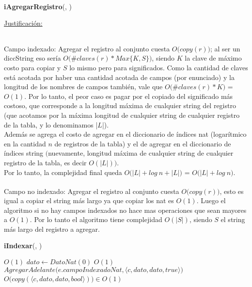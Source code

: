 \begin{Algoritmos}
\begin{algorithm}[H]{\textbf{iAgregarRegistro}(, )}
\begin{algorithmic}
  \end{algorithmic}
\end{algorithm}

\clearpage

\begin{algorithm}
  \begin{algorithmic}

    \Statex \underline{Justificación:} {\\
\quad\quad Campo indexado: Agregar el registro al conjunto cuesta $O\big(copy (r)\big)$; al ser un diccString eso sería $O\big(\#claves(r) * Max\{K,S\}\big)$, siendo $K$ la clave de máximo costo para copiar y $S$ lo mismo pero para significados. Como la cantidad de claves está acotada por haber una cantidad acotada de campos (por enunciado) y la longitud de los nombres de campos también, vale que $O\big(\#claves(r) * K\big)$ = $O(1)$. Por lo tanto, el peor caso es pagar por el copiado del significado más costoso, que corresponde a la longitud máxima de cualquier string del registro (que acotamos por la máxima longitud de cualquier string de cualquier registro de la tabla, y lo denominamos |$L$|). \\
\quad\quad Además se agrega el costo de agregar en el diccionario de índices nat (logarítmico en la cantidad $n$ de registros de la tabla) y el de agregar en el diccionario de índices string $\big($nuevamente, longitud máxima de cualquier string de cualquier registro de la tabla, es decir $O(|L|)\big)$. \\
\quad\quad Por lo tanto, la complejidad final queda $O\big(|L| + log\ n + |L|\big)$ = $O\big(|L| + log\ n\big)$.\\
\\
\quad\quad Campo no indexado: Agregar el registro al conjunto cuesta $O\big(copy(r)\big)$, esto es igual a copiar el string más largo ya que copiar los nat es $O(1)$. Luego el algoritmo si no hay campos indexados no hace mas operaciones que sean mayores a $O(1)$. Por lo tanto el algoritmo tiene complejidad $O(|S|)$, siendo $S$ el string más largo del registro a agregar.

}
  \medskip
  \end{algorithmic}
\end{algorithm}

\begin{algorithm}[H]{\textbf{iIndexar}(, )}
  \begin{algorithmic}
     \Comment $O(1)$
      \State $dato \gets DatoNat(0)$ \Comment $O(1)$
      \State $AgregarAdelante\big(e.campoIndexadoNat,  \big\langle c, dato, dato, true\big\rangle\big)$ \Comment $O\big(copy(\langle c, dato, dato, bool\rangle)\big) \in O(1)$
      \State $ $


\end{algorithmic}
\end{algorithm}
\end{Algoritmos}
